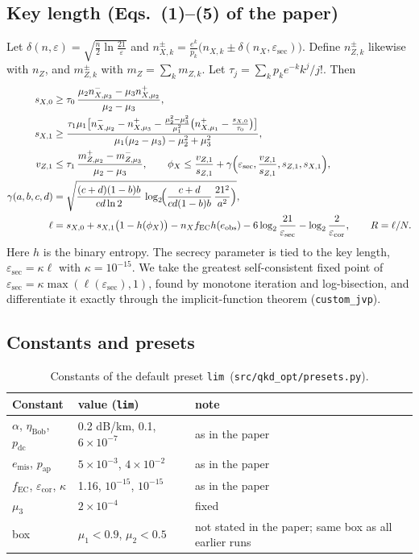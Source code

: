 \documentclass[11pt,a4paper]{article}
\newcommand{\plim}{\texttt{lim}}
\newcommand{\esec}{\varepsilon_{\mathrm{sec}}}
\newcommand{\ecor}{\varepsilon_{\mathrm{cor}}}
\begin{document}
\subsection{Key length (Eqs.~(1)--(5) of the paper)}
Let $\delta(n,\varepsilon)=\sqrt{\tfrac n2\ln\tfrac{21}{\varepsilon}}$ and
$n^\pm_{X,k}=\tfrac{e^{k}}{p_k}\bigl(n_{X,k}\pm\delta(n_X,\esec)\bigr)$. Define $n^\pm_{Z,k}$ likewise with $n_Z$,
and $m^\pm_{Z,k}$ with $m_Z=\sum_k m_{Z,k}$. Let $\tau_j=\sum_k p_k e^{-k}k^j/j!$. Then
\begin{align}
  s_{X,0} &\ge \tau_0\,\frac{\mu_2 n^-_{X,\mu_3}-\mu_3 n^+_{X,\mu_2}}{\mu_2-\mu_3},\\
  s_{X,1} &\ge \frac{\tau_1\mu_1\bigl[n^-_{X,\mu_2}-n^+_{X,\mu_3}-\frac{\mu_2^2-\mu_3^2}{\mu_1^2}\bigl(n^+_{X,\mu_1}-\frac{s_{X,0}}{\tau_0}\bigr)\bigr]}{\mu_1(\mu_2-\mu_3)-\mu_2^2+\mu_3^2},\\
  v_{Z,1} &\le \tau_1\,\frac{m^+_{Z,\mu_2}-m^-_{Z,\mu_3}}{\mu_2-\mu_3},\qquad
  \phi_X \le \frac{v_{Z,1}}{s_{Z,1}}+\gamma\Bigl(\esec,\frac{v_{Z,1}}{s_{Z,1}},s_{Z,1},s_{X,1}\Bigr),\\
  \gamma(a,b,c,d) &= \sqrt{\frac{(c+d)(1-b)b}{cd\ln 2}\,\log_2\!\Bigl(\frac{c+d}{cd(1-b)b}\,\frac{21^2}{a^2}\Bigr)},\\
  \ell &= s_{X,0}+s_{X,1}\bigl(1-h(\phi_X)\bigr)-n_Xf_{\mathrm{EC}}h(e_{\mathrm{obs}})-6\log_2\frac{21}{\esec}-\log_2\frac{2}{\ecor},
  \qquad R=\ell/N .
\end{align}
Here $h$ is the binary entropy. The secrecy parameter is tied to the key length, $\esec=\kappa\ell$ with
$\kappa=10^{-15}$. We take the greatest self-consistent fixed point of $\esec=\kappa\max(\ell(\esec),1)$, found by
monotone iteration and log-bisection, and differentiate it exactly through the implicit-function theorem
(\texttt{custom\_jvp}).

\subsection{Constants and presets}
\begin{table}[H]\centering\small
\begin{tabular}{lll}\toprule
Constant & value (\plim) & note\\\midrule
$\alpha$, $\eta_{\mathrm{Bob}}$, $p_{\mathrm{dc}}$ & 0.2 dB/km, 0.1, $6\times10^{-7}$ & as in the paper\\
$e_{\mathrm{mis}}$, $p_{\mathrm{ap}}$ & $5\times10^{-3}$, $4\times10^{-2}$ & as in the paper\\
$f_{\mathrm{EC}}$, $\ecor$, $\kappa$ & 1.16, $10^{-15}$, $10^{-15}$ & as in the paper\\
$\mu_3$ & $2\times10^{-4}$ & fixed\\
box & $\mu_1<0.9$, $\mu_2<0.5$ & not stated in the paper; same box as all earlier runs\\\bottomrule
\end{tabular}
\caption{Constants of the default preset \plim\ (\texttt{src/qkd\_opt/presets.py}).}
\end{table}
\end{document}
